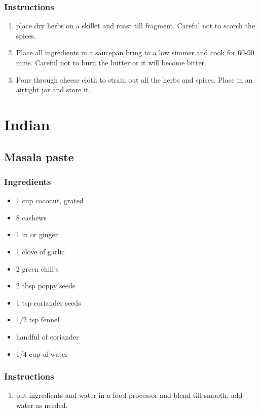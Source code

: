 \documentclass[11pt]{article}
\begin{document}
\subsubsection*{Instructions}
\label{sec:orga9a25d8}
\begin{enumerate}
\item place dry herbs on a skillet and roast till fragment. Careful not to scorch the spices.
\item Place all ingredients in a saucepan bring to a low simmer and cook for 60-90 mins. Careful not to burn the butter or it will become bitter.
\item Pour through cheese cloth to strain out all the herbs and spices. Place in an airtight jar and store it.
\end{enumerate}
\section{Indian}
\label{sec:org88489fc}
\subsection{Masala paste}
\label{sec:orgf208416}
\subsubsection*{Ingredients}
\label{sec:org5a6d90e}
\begin{itemize}
\item 1 cup coconut, grated
\item 8 cashews
\item 1 in or ginger
\item 1 clove of garlic
\item 2 green chili's
\item 2 tbsp poppy seeds
\item 1 tsp coriander seeds
\item 1/2 tsp fennel
\item handful of coriander
\item 1/4 cup of water
\end{itemize}
\subsubsection*{Instructions}
\label{sec:org6cf52fc}
\begin{enumerate}
\item put ingredients and water in a food processor and blend till smooth. add water as needed.
\end{enumerate}
\end{document}
